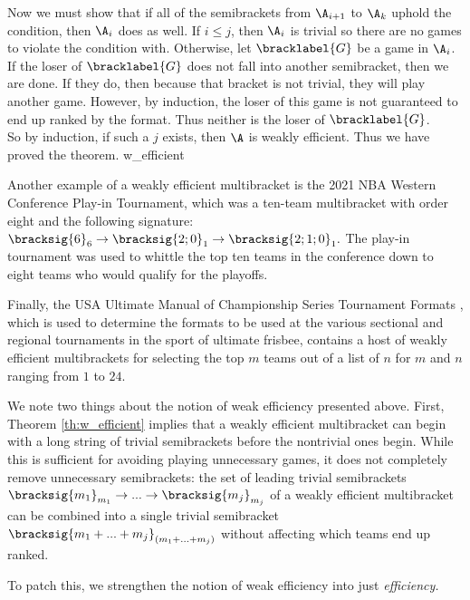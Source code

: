 {{        Now we must show that if all of the semibrackets from $\A_{i+1}$ to $\A_k$ uphold the condition, then $\A_i$ does as well. If $i \leq j$, then $\A_i$ is trivial so there are no games to violate the condition with. Otherwise, let $\bracklabel{G}$ be a game in $\A_i$. If the loser of $\bracklabel{G}$ does not fall into another semibracket, then we are done. If they do, then because that bracket is not trivial, they will play another game. However, by induction, the loser of this game is not guaranteed to end up ranked by the format. Thus neither is the loser of $\bracklabel{G}$.\\

        So by induction, if such a $j$ exists, then $\A$ is weakly efficient. Thus we have proved the theorem.
    }{w_efficient}

    Another example of a weakly efficient multibracket is the 2021 NBA Western Conference Play-in Tournament, which was a ten-team multibracket with order eight and the following signature:
    $\bracksig{6}_6 \to \bracksig{2;0}_1 \to \bracksig{2;1;0}_1.$ The play-in tournament was used to whittle the top ten teams in the conference down to eight teams who would qualify for the playoffs.


    Finally, the USA Ultimate Manual of Championship Series Tournament Formats \cite{ultimate}, which is used to determine the formats to be used at the various sectional and regional tournaments in the sport of ultimate frisbee, contains a host of weakly efficient multibrackets for selecting the top $m$ teams out of a list of $n$ for $m$ and $n$ ranging from $1$ to $24.$

    We note two things about the notion of weak efficiency presented above. First, Theorem \ref{th:w_efficient} implies that a weakly efficient multibracket can begin with a long string of trivial semibrackets before the nontrivial ones begin. While this is sufficient for avoiding playing unnecessary games, it does not completely remove unnecessary semibrackets: the set of leading trivial semibrackets $\bracksig{m_1}_{m_1} \to ... \to \bracksig{m_j}_{m_j}$ of a weakly efficient multibracket can be combined into a single trivial semibracket $\bracksig{m_1 + ... + m_j}_{(m_1 + ... + m_j)}$ without affecting which teams end up ranked.

    To patch this, we strengthen the notion of weak efficiency into just \textit{efficiency.}

}
